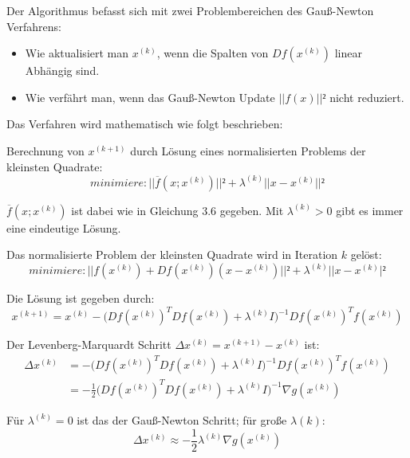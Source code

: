 Der Algorithmus befasst sich mit zwei Problembereichen des Gauß-Newton Verfahrens:

\begin{itemize}
\item Wie aktualisiert man $x^{(k)}$, wenn die Spalten von $Df(x^{(k)})$ linear Abhängig sind.

\item Wie verfährt man, wenn das Gauß-Newton Update $||f(x)||²$ nicht reduziert.
\end{itemize}

Das Verfahren wird mathematisch wie folgt beschrieben:

Berechnung von $x^{(k+1)}$ durch Lösung eines normalisierten Problems der kleinsten Quadrate:
\begin{equation}
minimiere: ||\overline{f}(x;x^{(k)})||² + \lambda^{(k)}||x-x^{(k)}||²
\end{equation}

$\overline{f}(x;x^{(k)})$ ist dabei wie in Gleichung 3.6 gegeben. Mit $\lambda^{(k)} > 0$ gibt es immer eine eindeutige Lösung.

Das normalisierte Problem der kleinsten Quadrate wird in Iteration $k$ gelöst:
\begin{equation}
minimiere: ||f(x^{(k)}) + Df(x^{(k)})(x-x^{(k)})||² + \lambda^{(k)}||x-x^{(k)}|²
\end{equation}

Die Lösung ist gegeben durch:
\begin{equation}
x^{(k+1)} = x^{(k)} -\Big(Df(x^{(k)})^TDf(x^{(k)})+\lambda^{(k)}I\Big)^{-1} Df(x^{(k)})^T f(x^{(k)})
\end{equation}

Der Levenberg-Marquardt Schritt $\Delta x^{(k)} = x^{(k+1)} - x^{(k)}$ ist:
\begin{equation}
\begin{aligned}
\Delta x^{(k)} &= -\Big(Df(x^{(k)})^TDf(x^{(k)})+\lambda^{(k)}I\Big)^{-1} Df(x^{(k)})^T f(x^{(k)})\\ &= -\frac{1}{2} \Big(Df(x^{(k)})^TDf(x^{(k)})+\lambda^{(k)}I\Big)^{-1} \nabla g(x^{(k)})
\end{aligned}
\end{equation}

Für $\lambda^{(k)}=0$ ist das der Gauß-Newton Schritt; für große $\lambda{(k)}$:
\begin{equation}
\Delta x^{(k)} \approx -\frac{1}{2}\lambda^{(k)}\nabla g(x^{(k)})
\end{equation}


